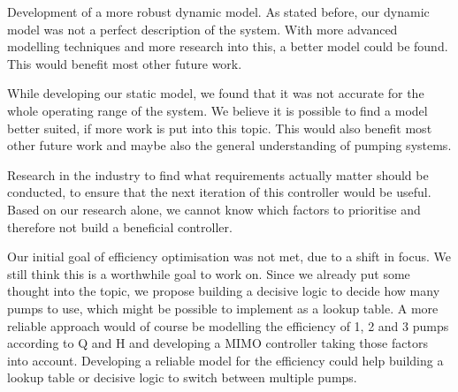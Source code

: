 Development of a more robust dynamic model.
As stated before,
our dynamic model was not a perfect description of the system.
With more advanced modelling techniques and more research into this,
a better model could be found.
This would benefit most other future work.

While developing our static model,
we found that it was not accurate for the whole operating range of the system.
We believe it is possible to find a model better suited,
if more work is put into this topic.
This would also benefit most other future work
and maybe also the general understanding of pumping systems.

Research in the industry to find what requirements actually matter should be conducted,
to ensure that the next iteration of this controller would be useful.
Based on our research alone,
we cannot know which factors to prioritise
and therefore not build a beneficial controller.

Our initial goal of efficiency optimisation was not met,
due to a shift in focus.
We still think this is a worthwhile goal to work on.
Since we already put some thought into the topic,
we propose building a decisive logic to decide how many pumps to use,
which might be possible to implement as a lookup table.
A more reliable approach would of course be modelling the efficiency of 1, 2 and 3 pumps according to Q and H
and developing a MIMO controller taking those factors into account.
Developing a reliable model for the efficiency could help building a lookup table or decisive logic to switch between multiple pumps.
